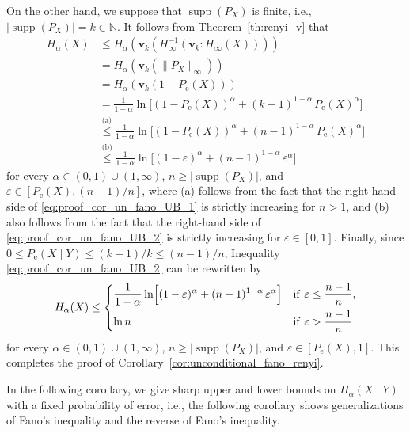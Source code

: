 \documentclass[conference, draftcls, onecolumn]{IEEEtran}
\theoremstyle{plain}
\newcommand{\bvec}[1]{\boldsymbol{#1}}
\newcommand{\supp}{\operatorname{supp}}
\newcommand{\thref}[1]{Theorem~\ref{#1}}
\newcommand{\corref}[1]{Corollary~\ref{#1}}
\begin{document}
\begin{IEEEproof}[Proof of \corref{cor:unconditional_fano_renyi}]
On the other hand, we suppose that $\supp( P_{X} )$ is finite, i.e., $|\!\supp( P_{X} )| = k \in \mathbb{N}$.
It follows from \thref{th:renyi_v} that
\begin{align}
H_{\alpha}(X)
& \le
H_{\alpha}( \bvec{v}_{k}( H_{\infty}^{-1}( \bvec{v}_{k} : H_{\infty}(X) ) ) )
\\
& =
H_{\alpha}( \bvec{v}_{k}( \| P_{X} \|_{\infty} ) )
\\
& =
H_{\alpha}( \bvec{v}_{k}( 1 - P_{\mathrm{e}}(X) ) )
\\
& =
\frac{ 1 }{ 1 - \alpha } \ln \! \Big[ (1 - P_{\mathrm{e}}(X))^{\alpha} + (k - 1)^{1 - \alpha} \, P_{\mathrm{e}}(X)^{\alpha} \Big]
\\
& \overset{\text{(a)}}{\le}
\frac{ 1 }{ 1 - \alpha } \ln \! \Big[ (1 - P_{\mathrm{e}}(X))^{\alpha} + (n - 1)^{1 - \alpha} \, P_{\mathrm{e}}(X)^{\alpha} \Big]
\label{eq:proof_cor_un_fano_UB_1} \\
& \overset{\text{(b)}}{\le}
\frac{ 1 }{ 1 - \alpha } \ln \! \Big[ (1 - \varepsilon)^{\alpha} + (n - 1)^{1 - \alpha} \, \varepsilon^{\alpha} \Big]
\label{eq:proof_cor_un_fano_UB_2}
\end{align}
for every $\alpha \in (0, 1) \cup (1, \infty)$, $n \ge |\!\supp( P_{X} ) |$, and $\varepsilon \in [P_{\mathrm{e}}(X), (n-1)/n]$, where (a) follows from the fact that the right-hand side of \eqref{eq:proof_cor_un_fano_UB_1} is strictly increasing for $n > 1$, and (b) also follows from the fact that the right-hand side of \eqref{eq:proof_cor_un_fano_UB_2} is strictly increasing for $\varepsilon \in [0, 1]$.
Finally, since $0 \le P_{\mathrm{e}}(X \mid Y) \le (k - 1)/ k \le (n - 1)/n$, Inequality \eqref{eq:proof_cor_un_fano_UB_2} can be rewritten by
\begin{align}
H_{\alpha}(X)
\le
\begin{dcases}
\frac{ 1 }{ 1 - \alpha } \ln \! \Big[ (1 - \varepsilon)^{\alpha} + (n - 1)^{1 - \alpha} \, \varepsilon^{\alpha} \Big]
& \mathrm{if} \ \varepsilon \le \frac{ n - 1 }{ n } ,
\\
\ln n
& \mathrm{if} \ \varepsilon > \frac{ n - 1 }{ n }
\end{dcases}
\end{align}
for every $\alpha \in (0, 1) \cup (1, \infty)$, $n \ge |\!\supp( P_{X} ) |$, and $\varepsilon \in [P_{\mathrm{e}}(X), 1]$.
This completes the proof of \corref{cor:unconditional_fano_renyi}.
\end{IEEEproof}



In the following corollary, we give sharp upper and lower bounds on $H_{\alpha}(X \mid Y)$ with a fixed probability of error, i.e., the following corollary shows generalizations of Fano's inequality and the reverse of Fano's inequality.
\end{document}
